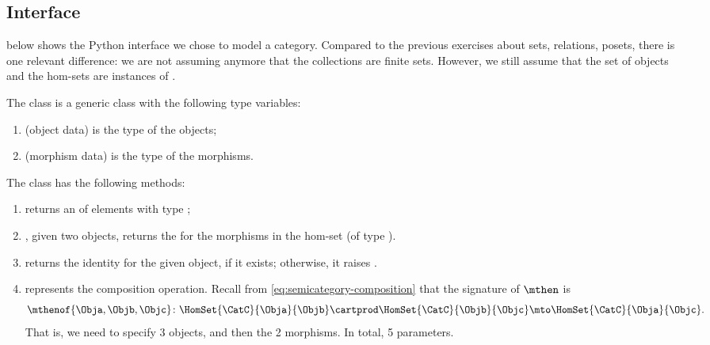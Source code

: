 
\subsection{Interface}

 below shows the Python interface we chose to model a category.
Compared to the previous exercises about sets, relations, posets, there is one relevant difference: 
we are not assuming anymore that the collections are finite sets. However, we still assume that 
the set of objects and the hom-sets are instances of \EnumerableSet.

The class \SemiCategory is a generic class with the following type variables:
\begin{enumerate}
    \item {} (object data) is the type of the objects;
    \item {} (morphism data) is the type of the morphisms.
\end{enumerate}

The class \SemiCategory has the following methods:
\begin{enumerate}
    \item {} returns an \EnumerableSet of elements with type ;
    \item {}, given two objects, returns the \EnumerableSet for the morphisms in the hom-set (of type ).
    \item {} returns the identity for the given object, if it exists; otherwise, it raises .
    \item {} represents the composition operation. 
Recall from \cref{eq:semicategory-composition} that the signature of $\mthen$ is
\begin{equation}
    \mthenof{\Obja,\Objb,\Objc}\colon \HomSet{\CatC}{\Obja}{\Objb} \cartprod \HomSet{\CatC}{\Objb}{\Objc}\mto \HomSet{\CatC}{\Obja}{\Objc}.
\end{equation}
That is, we need to specify 3 objects, and then the 2 morphisms. In total, 5 parameters.
\end{enumerate}





\clearpage

